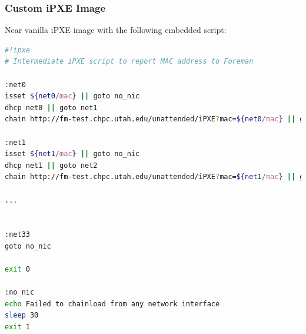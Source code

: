 \documentclass{beamer}
\begin{document}
\begin{frame}[fragile]
	\frametitle{Custom iPXE Image}
	\flushleft
	Near vanilla iPXE image with the following embedded script:

	\centering
	\begin{lstlisting}[language=bash,frame=single,basicstyle=\fontsize{4}{6pt}\selectfont]
#!ipxe
# Intermediate iPXE script to report MAC address to Foreman

:net0
isset ${net0/mac} || goto no_nic
dhcp net0 || goto net1
chain http://fm-test.chpc.utah.edu/unattended/iPXE?mac=${net0/mac} || goto net1

:net1
isset ${net1/mac} || goto no_nic
dhcp net1 || goto net2
chain http://fm-test.chpc.utah.edu/unattended/iPXE?mac=${net1/mac} || goto net2

...


:net33
goto no_nic

exit 0

:no_nic
echo Failed to chainload from any network interface
sleep 30
exit 1
  \end{lstlisting}

\end{frame}
\end{document}

